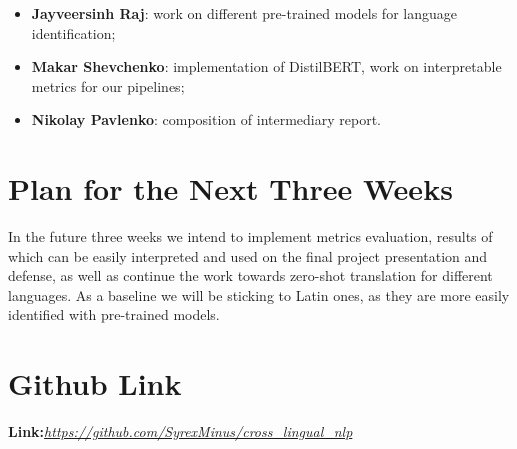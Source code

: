 \documentclass[]{article}
\begin{document}
	\begin{itemize}
		\item \textbf{Jayveersinh Raj}: work on different pre-trained models for language identification;
		\item \textbf{Makar Shevchenko}: implementation of DistilBERT, work on interpretable metrics for our pipelines;
		\item \textbf{Nikolay Pavlenko}: composition of intermediary report. 
	\end{itemize}
	
	\section{Plan for the Next Three Weeks}
	
	In the future three weeks we intend to implement metrics evaluation, results of which can be easily interpreted and used on the final project presentation and defense, as well as continue the work towards zero-shot translation for different languages. As a baseline we will be sticking to Latin ones, as they are more easily identified with pre-trained models.
	
	\section{Github Link}
	\textbf{Link:}\href{https://github.com/SyrexMinus/cross\_lingual\_nlp}{\emph{https://github.com/SyrexMinus/cross\_lingual\_nlp}}
	
\end{document}
